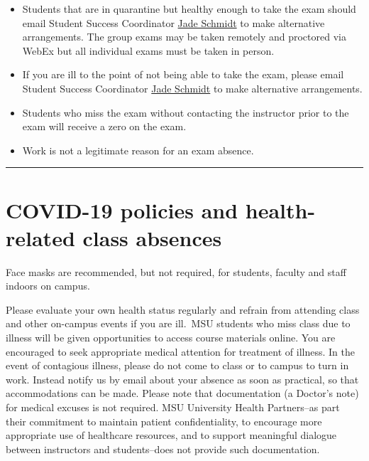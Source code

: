 \documentclass[
]{article}
\providecommand{\tightlist}{%
  \setlength{\itemsep}{0pt}\setlength{\parskip}{0pt}}
\begin{document}
\begin{itemize}
  \begin{itemize}
  \tightlist
  \item
    Students that are in quarantine but healthy enough to take the exam
    should email Student Success Coordinator
    \href{mailto:\%20jade.schmidt2@montana.edu}{Jade Schmidt} to make
    alternative arrangements. The group exams may be taken remotely and
    proctored via WebEx but all individual exams must be taken in
    person.
  \item
    If you are ill to the point of not being able to take the exam,
    please email Student Success Coordinator
    \href{mailto:\%20jade.schmidt2@montana.edu}{Jade Schmidt} to make
    alternative arrangements.\\
  \item
    Students who miss the exam without contacting the instructor prior
    to the exam will receive a zero on the exam.
  \item
    Work is not a legitimate reason for an exam absence.
  \end{itemize}
\end{itemize}

\begin{center}\rule{0.5\linewidth}{0.5pt}\end{center}

\section{COVID-19 policies and health-related class
absences}\label{covid-19-policies-and-health-related-class-absences}

Face masks are recommended, but not required, for students, faculty and
staff indoors on campus.

Please evaluate your own health status regularly and refrain from
attending class and other on-campus events if you are ill.~MSU students
who miss class due to illness will be given opportunities to access
course materials online. You are encouraged to seek appropriate medical
attention for treatment of illness. In the event of contagious illness,
please do not come to class or to campus to turn in work. Instead notify
us by email about your absence as soon as practical, so that
accommodations can be made. Please note that documentation (a Doctor's
note) for medical excuses is not required. MSU University Health
Partners--as part their commitment to maintain patient confidentiality,
to encourage more appropriate use of healthcare resources, and to
support meaningful dialogue between instructors and students--does not
provide such documentation.
\end{document}
